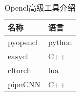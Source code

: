 \begin{table}[H]
\centering
\begin{tabular}{ll}
\toprule
  名称&	语言\\
\midrule
  pyopencl&	python\\
  easycl& C++\\
  cltorch& lua \\
  pipnCNN& C++\\
\bottomrule
\end{tabular}
\caption{Opencl高级工具介绍}
\label{tbl:compare-opencl-tools}
\end{table}
